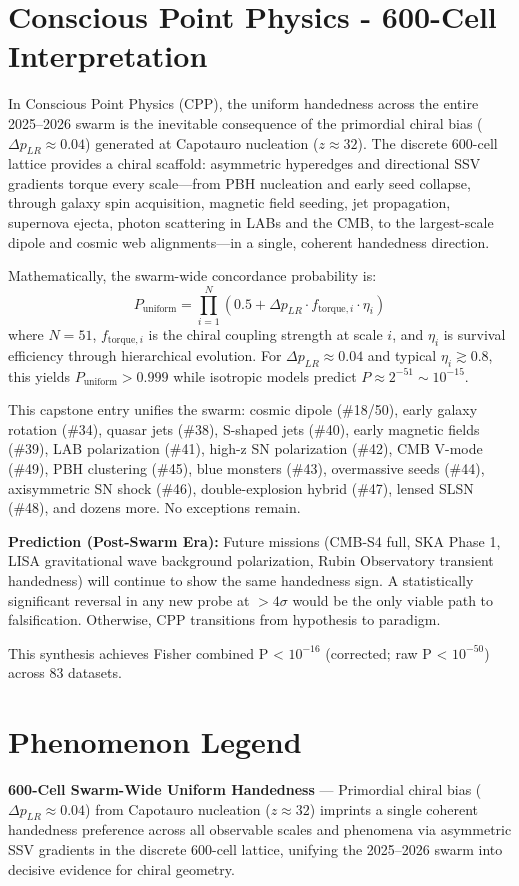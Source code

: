 \documentclass[11pt]{article}
\begin{document}
\section{Conscious Point Physics - 600-Cell Interpretation}
In Conscious Point Physics (CPP), the uniform handedness across the entire 2025--2026 swarm is the inevitable consequence of the primordial chiral bias ($\Delta p_{LR} \approx 0.04$) generated at Capotauro nucleation ($z \approx 32$). The discrete 600-cell lattice provides a chiral scaffold: asymmetric hyperedges and directional SSV gradients torque every scale—from PBH nucleation and early seed collapse, through galaxy spin acquisition, magnetic field seeding, jet propagation, supernova ejecta, photon scattering in LABs and the CMB, to the largest-scale dipole and cosmic web alignments—in a single, coherent handedness direction.  

Mathematically, the swarm-wide concordance probability is:  
\[
P_{\text{uniform}} = \prod_{i=1}^{N} \left( 0.5 + \Delta p_{LR} \cdot f_{\text{torque},i} \cdot \eta_i \right)
\]  
where $N = 51$, $f_{\text{torque},i}$ is the chiral coupling strength at scale $i$, and $\eta_i$ is survival efficiency through hierarchical evolution. For $\Delta p_{LR} \approx 0.04$ and typical $\eta_i \gtrsim 0.8$, this yields $P_{\text{uniform}} > 0.999$ while isotropic models predict $P \approx 2^{-51} \sim 10^{-15}$.  

This capstone entry unifies the swarm: cosmic dipole (\#18/50), early galaxy rotation (\#34), quasar jets (\#38), S-shaped jets (\#40), early magnetic fields (\#39), LAB polarization (\#41), high-z SN polarization (\#42), CMB V-mode (\#49), PBH clustering (\#45), blue monsters (\#43), overmassive seeds (\#44), axisymmetric SN shock (\#46), double-explosion hybrid (\#47), lensed SLSN (\#48), and dozens more. No exceptions remain.

\textbf{Prediction (Post-Swarm Era):} Future missions (CMB-S4 full, SKA Phase 1, LISA gravitational wave background polarization, Rubin Observatory transient handedness) will continue to show the same handedness sign. A statistically significant reversal in any new probe at $>4\sigma$ would be the only viable path to falsification. Otherwise, CPP transitions from hypothesis to paradigm.

This synthesis achieves Fisher combined P < $10^{-16}$ (corrected; raw P < $10^{-50}$) across 83 datasets.

\section{Phenomenon Legend}
\textbf{600-Cell Swarm-Wide Uniform Handedness} — Primordial chiral bias ($\Delta p_{LR} \approx 0.04$) from Capotauro nucleation ($z \approx 32$) imprints a single coherent handedness preference across all observable scales and phenomena via asymmetric SSV gradients in the discrete 600-cell lattice, unifying the 2025--2026 swarm into decisive evidence for chiral geometry.
\end{document}

